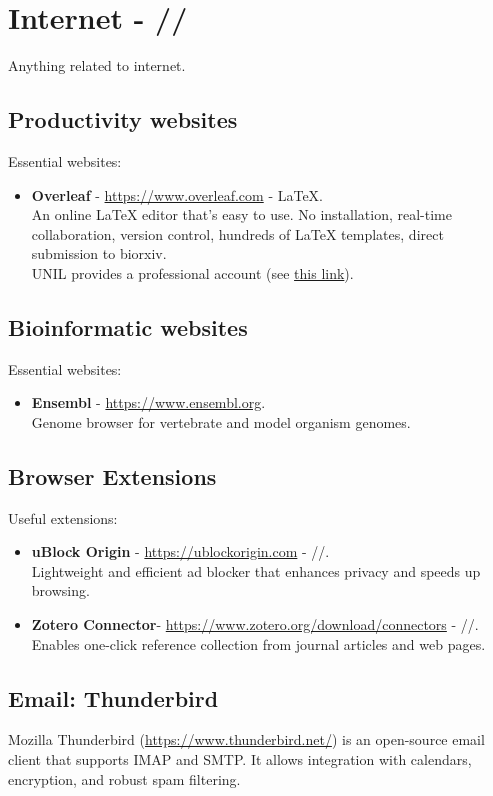 \section{Internet - \faChrome/\faFirefox/\faInternetExplorer}
Anything related to internet.

\subsection{Productivity websites}
Essential websites:
\begin{itemize}
    \item \textbf{Overleaf} - \url{https://www.overleaf.com} - \LaTeX.\\
    An online LaTeX editor that's easy to use. No installation, real-time collaboration, version control, hundreds of LaTeX templates, direct submission to biorxiv.\\
    UNIL provides a professional account (see \href{https://www.overleaf.com/edu/unil}{this link}).
\end{itemize}

\subsection{Bioinformatic websites}
Essential websites:
\begin{itemize}
    \item \textbf{Ensembl} - \url{https://www.ensembl.org}.\\
    Genome browser for vertebrate and model organism genomes.
\end{itemize}

\subsection{Browser Extensions}
Useful extensions:
\begin{itemize}
    \item \textbf{uBlock Origin} - \url{https://ublockorigin.com} - \faChrome/\faFirefox/\faInternetExplorer.\\
    Lightweight and efficient ad blocker that enhances privacy and speeds up browsing.
    \item \textbf{Zotero Connector}- \url{https://www.zotero.org/download/connectors} - \faChrome/\faFirefox/\faInternetExplorer.\\
    Enables one-click reference collection from journal articles and web pages.
\end{itemize}

\subsection{Email: Thunderbird}
Mozilla Thunderbird (\url{https://www.thunderbird.net/}) is an open-source email client that supports IMAP and SMTP. It allows integration with calendars, encryption, and robust spam filtering.
